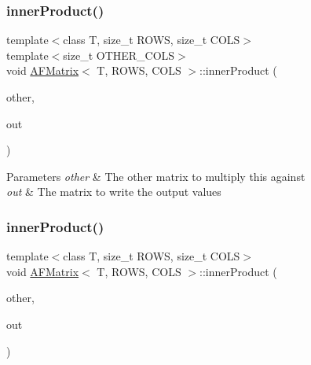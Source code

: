 \subsubsection{\texorpdfstring{inner\+Product()}{innerProduct()}\hspace{0.1cm}{\footnotesize\ttfamily [1/3]}}
{\footnotesize\ttfamily template$<$class T, size\+\_\+t R\+O\+WS, size\+\_\+t C\+O\+LS$>$ \\
template$<$size\+\_\+t O\+T\+H\+E\+R\+\_\+\+C\+O\+LS$>$ \\
void \hyperlink{class_a_f_matrix}{A\+F\+Matrix}$<$ T, R\+O\+WS, C\+O\+LS $>$\+::inner\+Product (\begin{DoxyParamCaption}\item[{\hyperlink{class_a_f_matrix}{A\+F\+Matrix}$<$ T, C\+O\+LS, O\+T\+H\+E\+R\+\_\+\+C\+O\+LS $>$ $\ast$}]{other,  }\item[{\hyperlink{class_a_f_matrix}{A\+F\+Matrix}$<$ T, R\+O\+WS, O\+T\+H\+E\+R\+\_\+\+C\+O\+LS $>$ $\ast$}]{out }\end{DoxyParamCaption})\hspace{0.3cm}{\ttfamily [inline]}}


\begin{DoxyParams}{Parameters}
{\em other} & The other matrix to multiply this against \\
\hline
{\em out} & The matrix to write the output values \\
\hline
\end{DoxyParams}
\mbox{\label{class_a_f_matrix_a9f0e4b22b84400a30d275be6bd67d128}} 
\subsubsection{\texorpdfstring{inner\+Product()}{innerProduct()}\hspace{0.1cm}{\footnotesize\ttfamily [2/3]}}
{\footnotesize\ttfamily template$<$class T, size\+\_\+t R\+O\+WS, size\+\_\+t C\+O\+LS$>$ \\
void \hyperlink{class_a_f_matrix}{A\+F\+Matrix}$<$ T, R\+O\+WS, C\+O\+LS $>$\+::inner\+Product (\begin{DoxyParamCaption}\item[{array$<$ T, R\+O\+WS $>$ $\ast$}]{other,  }\item[{\hyperlink{class_a_f_matrix}{A\+F\+Matrix}$<$ T, C\+O\+LS, 1 $>$ $\ast$}]{out }\end{DoxyParamCaption})\hspace{0.3cm}{\ttfamily [inline]}}

